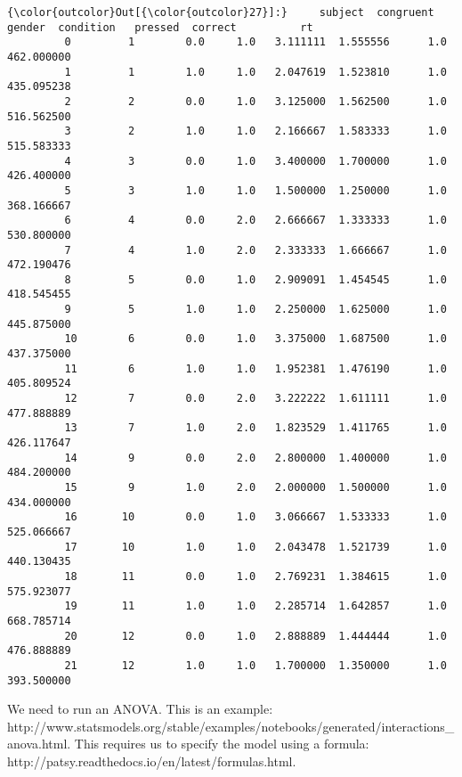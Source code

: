 \documentclass[11pt]{article}
\begin{document}
\begin{Verbatim}[commandchars=\\\{\}]
{\color{outcolor}Out[{\color{outcolor}27}]:}     subject  congruent  gender  condition   pressed  correct          rt
         0         1        0.0     1.0   3.111111  1.555556      1.0  462.000000
         1         1        1.0     1.0   2.047619  1.523810      1.0  435.095238
         2         2        0.0     1.0   3.125000  1.562500      1.0  516.562500
         3         2        1.0     1.0   2.166667  1.583333      1.0  515.583333
         4         3        0.0     1.0   3.400000  1.700000      1.0  426.400000
         5         3        1.0     1.0   1.500000  1.250000      1.0  368.166667
         6         4        0.0     2.0   2.666667  1.333333      1.0  530.800000
         7         4        1.0     2.0   2.333333  1.666667      1.0  472.190476
         8         5        0.0     1.0   2.909091  1.454545      1.0  418.545455
         9         5        1.0     1.0   2.250000  1.625000      1.0  445.875000
         10        6        0.0     1.0   3.375000  1.687500      1.0  437.375000
         11        6        1.0     1.0   1.952381  1.476190      1.0  405.809524
         12        7        0.0     2.0   3.222222  1.611111      1.0  477.888889
         13        7        1.0     2.0   1.823529  1.411765      1.0  426.117647
         14        9        0.0     2.0   2.800000  1.400000      1.0  484.200000
         15        9        1.0     2.0   2.000000  1.500000      1.0  434.000000
         16       10        0.0     1.0   3.066667  1.533333      1.0  525.066667
         17       10        1.0     1.0   2.043478  1.521739      1.0  440.130435
         18       11        0.0     1.0   2.769231  1.384615      1.0  575.923077
         19       11        1.0     1.0   2.285714  1.642857      1.0  668.785714
         20       12        0.0     1.0   2.888889  1.444444      1.0  476.888889
         21       12        1.0     1.0   1.700000  1.350000      1.0  393.500000
\end{Verbatim}
            
    We need to run an ANOVA. This is an example:
http://www.statsmodels.org/stable/examples/notebooks/generated/interactions\_anova.html.
This requires us to specify the model using a formula:
http://patsy.readthedocs.io/en/latest/formulas.html.
\end{document}
